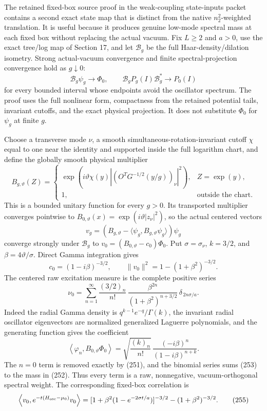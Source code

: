 \documentclass[
  11pt,
]{article}
\begin{document}
The retained fixed-box source proof in the weak-coupling state-inputs
packet contains a second exact state map that is distinct from the
native \(n_2^2\)-weighted translation. It is useful because it produces
genuine low-mode spectral mass at each fixed box without replacing the
actual vacuum. Fix \(L\ge2\) and \(a>0\), use the exact tree/log map of
Section 17, and let \(\mathcal B_g\) be the full Haar-density/dilation
isometry. Strong actual-vacuum convergence and finite
spectral-projection convergence hold as \(g\downarrow0\): \[
 \mathcal B_g\psi_g\longrightarrow\Phi_0,\qquad
 \mathcal B_gP_g(I)\mathcal B_g^*\longrightarrow P_0(I)
 \tag{249}
\] for every bounded interval whose endpoints avoid the oscillator
spectrum. The proof uses the full nonlinear form, compactness from the
retained potential tails, invariant cutoffs, and the exact physical
projection. It does not substitute \(\Phi_0\) for \(\psi_g\) at finite
\(g\).

Choose a transverse mode \(\nu\), a smooth
simultaneous-rotation-invariant cutoff \(\chi\) equal to one near the
identity and supported inside the full logarithm chart, and define the
globally smooth physical multiplier \[
 B_{g,\vartheta}(Z)=
 \begin{cases}
 \exp\!\left(i\vartheta\chi(y)
      |(O^TG^{-1/2}(y/g))_\nu|^2\right),& Z=\exp(y),\\
 1,&\text{outside the chart}.
 \end{cases}
 \tag{250}
\] This is a bounded unitary function for every \(g>0\). Its transported
multiplier converges pointwise to
\(B_{0,\vartheta}(x)=\exp(i\vartheta|z_\nu|^2)\), so the actual centered
vectors \[
 v_g=(B_{g,\vartheta}-\langle\psi_g,B_{g,\vartheta}\psi_g\rangle)\psi_g
 \tag{251}
\] converge strongly under \(\mathcal B_g\) to
\(v_0=(B_{0,\vartheta}-c_0)\Phi_0\). Put \(\sigma=\sigma_\nu\),
\(k=3/2\), and \(\beta=4\vartheta/\sigma\). Direct Gamma integration
gives \[
 c_0=(1-i\beta)^{-3/2},\qquad
 \|v_0\|^2=1-(1+\beta^2)^{-3/2}.
 \tag{252}
\] The centered raw excitation measure is the complete positive series
\[
 \nu_0=
 \sum_{n=1}^{\infty}
 \frac{(3/2)_n}{n!}\,
 \frac{\beta^{2n}}{(1+\beta^2)^{n+3/2}}\,
 \delta_{\,2n\sigma/a}.
 \tag{253}
\] Indeed the radial Gamma density is \(q^{k-1}e^{-q}/\Gamma(k)\), the
invariant radial oscillator eigenvectors are normalized generalized
Laguerre polynomials, and the generating function gives the coefficient
\[
 \left\langle\varphi_n,B_{0,\vartheta}\Phi_0\right\rangle
 =\sqrt{\frac{(k)_n}{n!}}\,
   \frac{(-i\beta)^n}{(1-i\beta)^{n+k}}.
 \tag{254}
\] The \(n=0\) term is removed exactly by (251), and the binomial series
sums (253) to the mass in (252). Thus every term is a raw, nonnegative,
vacuum-orthogonal spectral weight. The corresponding fixed-box
correlation is \[
 \left\langle v_0,e^{-t(H_{\rm osc}-\mu_0)}v_0\right\rangle
 =
 [1+\beta^2(1-e^{-2\sigma t/a})]^{-3/2}
 -(1+\beta^2)^{-3/2}.
 \tag{255}
\]
\end{document}
